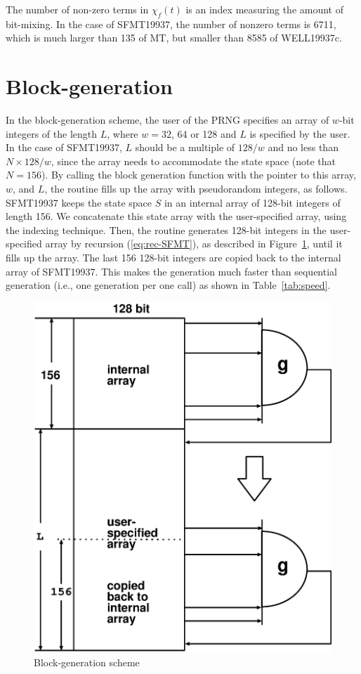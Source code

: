 \documentclass[acmnow]{acmtrans2m}
\begin{document}
\begin{remark}
The number of non-zero terms in $\chi_f(t)$ is 
an index measuring the amount of bit-mixing. 
In the case of SFMT19937, the number of nonzero 
terms is 6711, which is much larger than 135 of MT, 
but smaller than 8585 of WELL19937c. 
\end{remark}

\section{Block-generation}\label{sec:block}
In the block-generation scheme, 
the user of the PRNG specifies an array
of $w$-bit integers of the length $L$, 
where $w=32$, 64 or 128 and $L$ is specified
by the user.
In the case of SFMT19937,
$L$ should be a multiple of $128/w$
and no less than $N \times 128/w$,
since the array needs to accommodate the state space
(note that $N=156$).
By calling the block generation function 
with the pointer to this array, $w$, and $L$, 
the routine fills up the array with
pseudorandom integers, as follows. SFMT19937 keeps the state
space $S$ in an internal array of 128-bit integers of length 156.
We concatenate this state array with the user-specified array, 
using the indexing technique.
Then, the routine generates 128-bit integers in the user-specified 
array by recursion (\ref{eq:rec-SFMT}), as described
in Figure~\ref{fig:B1}, until it fills up the array.
The last 156 128-bit integers
are copied back to the internal array
of SFMT19937. 
This makes the generation much faster than sequential generation
(i.e., one generation per one call) as shown in Table~\ref{tab:speed}.
\begin{figure}
\begin{center}
\includegraphics[width=0.7\linewidth,height=0.7\textheight,
keepaspectratio]{fill_array.eps}
\end{center}
\caption{Block-generation scheme}
\label{fig:B1}
\end{figure}



\begin{received}
\end{received}
\end{document}
